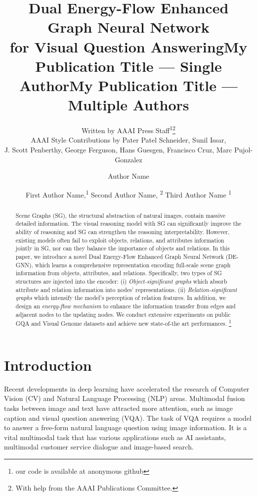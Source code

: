 \documentclass[letterpaper]{article} %
\title{Dual Energy-Flow Enhanced Graph Neural Network\\ for Visual Question Answering}
\author{
    Written by AAAI Press Staff\textsuperscript{\rm 1}\thanks{With help from the AAAI Publications Committee.}\\
    AAAI Style Contributions by Pater Patel Schneider,
    Sunil Issar,\\
    J. Scott Penberthy,
    George Ferguson,
    Hans Guesgen,
    Francisco Cruz\equalcontrib,
    Marc Pujol-Gonzalez\equalcontrib
}
\title{My Publication Title --- Single Author}
\author {
    Author Name
}
\title{My Publication Title --- Multiple Authors}
\author {
    First Author Name,\textsuperscript{\rm 1}
    Second Author Name, \textsuperscript{\rm 2}
    Third Author Name \textsuperscript{\rm 1}
}
\begin{document}
\maketitle

\begin{abstract}
Scene Graphs (SG), the structural abstraction of natural images, contain massive detailed information. The visual reasoning model with SG can significantly improve the ability of reasoning and SG can strengthen the reasoning interpretability. However, existing models often fail to exploit objects, relations, and attributes information jointly in SG, nor can they balance the importance of objects and relations. In this paper, we introduce a novel Dual Energy-Flow Enhanced Graph Neural Network (DE-GNN), which learns a comprehensive representation encoding full-scale scene graph information from objects, attributes, and relations.
Specifically, two types of SG structures are injected into the encoder: (i) \textit{Object-significant graphs} which absorb attribute and relation information into nodes' representations.  (ii) \textit{Relation-significant graphs} which intensify the model's perception of relation features. In addition, we design an \textit{energy-flow mechanism} to enhance the information transfer from edges and adjacent nodes to the updating nodes. We conduct extensive experiments on public GQA and Visual Genome datasets and achieve new state-of-the art performances.
\footnote{our code is available at anonymous github}
\end{abstract}

\section{Introduction}
Recent developments in deep learning have accelerated the research of Computer Vision (CV) and Natural Language Processing (NLP) areas. Multimodal fusion tasks between image and text have attracted more attention, such as image caption and visual question answering (VQA). The task of VQA requires a model to answer a free-form natural language question using image information. It is a vital multimodal task that has various applications such as AI assistants, multimodal customer service dialogue and image-based search. 
\end{document}

